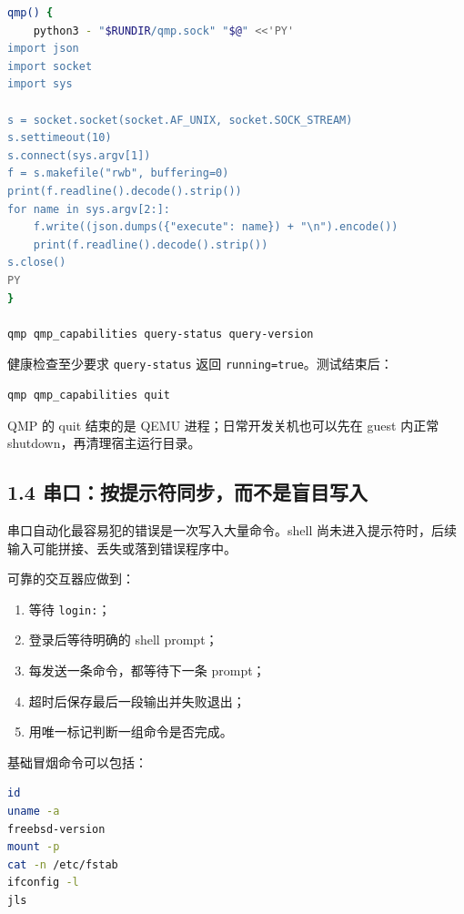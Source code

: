 \documentclass[
  11pt,
  UTF8,
  a4paper,
  fontset=fandol]{ctexart}
\newcommand{\passthrough}[1]{#1}
\providecommand{\tightlist}{%
  \setlength{\itemsep}{0pt}\setlength{\parskip}{0pt}}
\begin{document}
\begin{lstlisting}[language=sh]
qmp() {
    python3 - "$RUNDIR/qmp.sock" "$@" <<'PY'
import json
import socket
import sys

s = socket.socket(socket.AF_UNIX, socket.SOCK_STREAM)
s.settimeout(10)
s.connect(sys.argv[1])
f = s.makefile("rwb", buffering=0)
print(f.readline().decode().strip())
for name in sys.argv[2:]:
    f.write((json.dumps({"execute": name}) + "\n").encode())
    print(f.readline().decode().strip())
s.close()
PY
}

qmp qmp_capabilities query-status query-version
\end{lstlisting}

健康检查至少要求 \passthrough{\lstinline!query-status!} 返回
\passthrough{\lstinline!running=true!}。测试结束后：

\begin{lstlisting}[language=sh]
qmp qmp_capabilities quit
\end{lstlisting}

QMP 的 quit 结束的是 QEMU 进程；日常开发关机也可以先在 guest 内正常
shutdown，再清理宿主运行目录。

\subsection{1.4
串口：按提示符同步，而不是盲目写入}\label{ux4e32ux53e3ux6309ux63d0ux793aux7b26ux540cux6b65ux800cux4e0dux662fux76f2ux76eeux5199ux5165}

串口自动化最容易犯的错误是一次写入大量命令。shell
尚未进入提示符时，后续输入可能拼接、丢失或落到错误程序中。

可靠的交互器应做到：

\begin{enumerate}
\def\labelenumi{\arabic{enumi}.}
\tightlist
\item
  等待 \passthrough{\lstinline!login:!}；
\item
  登录后等待明确的 shell prompt；
\item
  每发送一条命令，都等待下一条 prompt；
\item
  超时后保存最后一段输出并失败退出；
\item
  用唯一标记判断一组命令是否完成。
\end{enumerate}

基础冒烟命令可以包括：

\begin{lstlisting}[language=sh]
id
uname -a
freebsd-version
mount -p
cat -n /etc/fstab
ifconfig -l
jls
\end{lstlisting}
\end{document}
